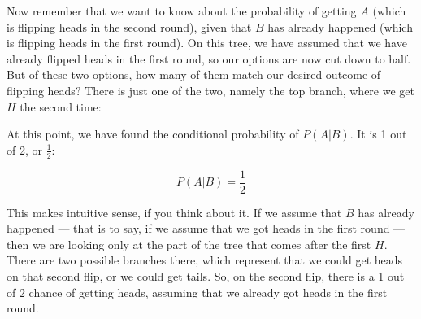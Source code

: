 \documentclass[../../../main.tex]{subfiles}
\begin{document}
\noindent
Now remember that we want to know about the probability of getting $A$ (which is flipping heads in the second round), given that $B$ has already happened (which is flipping heads in the first round). On this tree, we have assumed that we have already flipped heads in the first round, so our options are now cut down to half. But of these two options, how many of them match our desired outcome of flipping heads? There is just one of the two, namely the top branch, where we get $H$ the second time:

\begin{center}
\end{center}

\noindent
At this point, we have found the conditional probability of $P(A | B)$. It is 1 out of 2, or $\frac{1}{2}$:

\begin{equation*}
  P(A | B) = \frac{1}{2}
\end{equation*}

\noindent
This makes intuitive sense, if you think about it. If we assume that $B$ has already happened --- that is to say, if we assume that we got heads in the first round --- then we are looking only at the part of the tree that comes after the first $H$. There are two possible branches there, which represent that we could get heads on that second flip, or we could get tails. So, on the second flip, there is a 1 out of 2 chance of getting heads, assuming that we already got heads in the first round.
\end{document}
